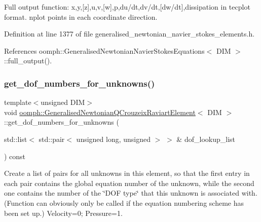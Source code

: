 Full output function\+: x,y,\mbox{[}z\mbox{]},u,v,\mbox{[}w\mbox{]},p,du/dt,dv/dt,\mbox{[}dw/dt\mbox{]},dissipation in tecplot format. nplot points in each coordinate direction. 



Definition at line 1377 of file generalised\+\_\+newtonian\+\_\+navier\+\_\+stokes\+\_\+elements.\+h.



References oomph\+::\+Generalised\+Newtonian\+Navier\+Stokes\+Equations$<$ D\+I\+M $>$\+::full\+\_\+output().

\mbox{\label{classoomph_1_1GeneralisedNewtonianQCrouzeixRaviartElement_a149673f13602b36ed16a660950d6355f}} 
\subsubsection{\texorpdfstring{get\+\_\+dof\+\_\+numbers\+\_\+for\+\_\+unknowns()}{get\_dof\_numbers\_for\_unknowns()}}
{\footnotesize\ttfamily template$<$unsigned D\+IM$>$ \\
void \hyperlink{classoomph_1_1GeneralisedNewtonianQCrouzeixRaviartElement}{oomph\+::\+Generalised\+Newtonian\+Q\+Crouzeix\+Raviart\+Element}$<$ D\+IM $>$\+::get\+\_\+dof\+\_\+numbers\+\_\+for\+\_\+unknowns (\begin{DoxyParamCaption}\item[{std\+::list$<$ std\+::pair$<$ unsigned long, unsigned $>$ $>$ \&}]{dof\+\_\+lookup\+\_\+list }\end{DoxyParamCaption}) const\hspace{0.3cm}{\ttfamily [virtual]}}



Create a list of pairs for all unknowns in this element, so that the first entry in each pair contains the global equation number of the unknown, while the second one contains the number of the \char`\"{}\+D\+O\+F type\char`\"{} that this unknown is associated with. (Function can obviously only be called if the equation numbering scheme has been set up.) Velocity=0; Pressure=1. 

